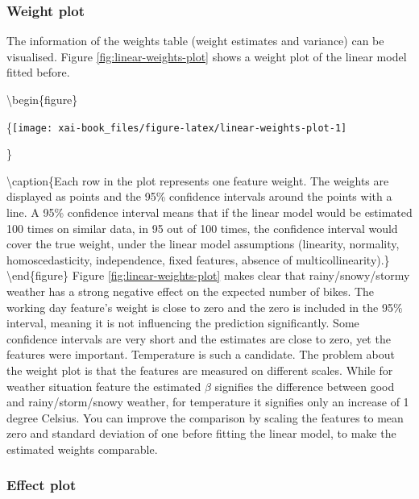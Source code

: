 \documentclass[12pt,]{krantz}
\theoremstyle{definition}
\theoremstyle{definition}
\theoremstyle{definition}
\theoremstyle{remark}
\begin{document}
\subsubsection{Weight plot}\label{weight-plot}

The information of the weights table (weight estimates and variance) can
be visualised. Figure \ref{fig:linear-weights-plot} shows a weight plot
of the linear model fitted before.

\textbackslash{}begin\{figure\}

\{\centering \texttt{[image: xai-book\_files/figure-latex/linear-weights-plot-1]}

\}

\textbackslash{}caption\{Each row in the plot represents one feature
weight. The weights are displayed as points and the 95\% confidence
intervals around the points with a line. A 95\% confidence interval
means that if the linear model would be estimated 100 times on similar
data, in 95 out of 100 times, the confidence interval would cover the
true weight, under the linear model assumptions (linearity, normality,
homoscedasticity, independence, fixed features, absence of
multicollinearity).\}\label{fig:linear-weights-plot}
\textbackslash{}end\{figure\} Figure \ref{fig:linear-weights-plot} makes
clear that rainy/snowy/stormy weather has a strong negative effect on
the expected number of bikes. The working day feature's weight is close
to zero and the zero is included in the 95\% interval, meaning it is not
influencing the prediction significantly. Some confidence intervals are
very short and the estimates are close to zero, yet the features were
important. Temperature is such a candidate. The problem about the weight
plot is that the features are measured on different scales. While for
weather situation feature the estimated \(\beta\) signifies the
difference between good and rainy/storm/snowy weather, for temperature
it signifies only an increase of 1 degree Celsius. You can improve the
comparison by scaling the features to mean zero and standard deviation
of one before fitting the linear model, to make the estimated weights
comparable.

\subsubsection{Effect plot}\label{effect-plot}
\end{document}
